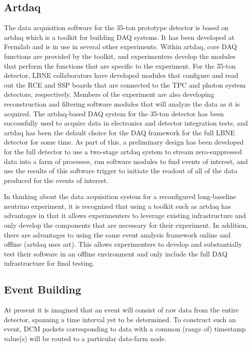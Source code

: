 \subsection{Artdaq}

The data acquisition software for the 35-ton prototype detector is
based on artdaq which is a toolkit for building DAQ systems.  It has
been developed at Fermilab and is in use in several other experiments.
Within artdaq, core DAQ functions are provided by the toolkit, and
experimenters develop the modules that perform the functions that are
specific to the experiment.  For the 35-ton detector, LBNE
collaborators have developed modules that configure and read out the
RCE and SSP boards that are connected to the TPC and photon system
detectors, respectively.  Members of the experiment are also
developing reconstruction and filtering software modules that will
analyze the data as it is acquired.  The artdaq-based DAQ system for
the 35-ton detector has been successfully used to acquire data in
electronics and detector integration tests, and artdaq has been the
default choice for the DAQ framework for the full LBNE detector for
some time.  As part of this, a preliminary design has been developed
for the full detector to use a two-stage artdaq system to stream
zero-suppressed data into a farm of processes, run software modules to
find events of interest, and use the results of this software trigger
to initiate the readout of all of the data produced for the events of
interest.

In thinking about the data acquisition system for a reconfigured
long-baseline neutrino experiment, it is recognized that using a
toolkit such as artdaq has advantages in that it allows experimenters
to leverage existing infrastructure and only develop the components
that are necessary for their experiment.  In addition, there are
advantages to using the same event analysis framework online and
offline (artdaq uses art).  This allows experimenters to develop and
substantially test their software in an offline environment and only
include the full DAQ infrastructure for final testing.

\subsection{Event Building}

At present it is imagined that an event will consist of raw data from the 
entire detector, spanning a time interval yet to be determined.  To construct 
such an event, DCM packets corresponding to data with a common (range of) 
timestamp value(s) will be routed to a particular data-farm node.  

